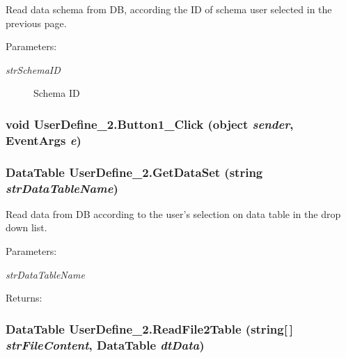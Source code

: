 Read data schema from DB, according the ID of schema user selected in the previous page. 

\begin{Desc}
\item[Parameters:]
\begin{description}
\item[{\em str\-Schema\-ID}]Schema ID\end{description}
\end{Desc}
\subsubsection{\setlength{\rightskip}{0pt plus 5cm}void User\-Define\_\-2.Button1\_\-Click (object {\em sender}, Event\-Args {\em e})\hspace{0.3cm}{\tt  [protected]}}\label{class_user_define__2_5b011d4483a8a941a435c3bbde949ae3}


\subsubsection{\setlength{\rightskip}{0pt plus 5cm}Data\-Table User\-Define\_\-2.Get\-Data\-Set (string {\em str\-Data\-Table\-Name})\hspace{0.3cm}{\tt  [private]}}\label{class_user_define__2_0c53ff63b611c1d629c20e8965177472}


Read data from DB according to the user's selection on data table in the drop down list. 

\begin{Desc}
\item[Parameters:]
\begin{description}
\item[{\em str\-Data\-Table\-Name}]\end{description}
\end{Desc}
\begin{Desc}
\item[Returns:]\end{Desc}
\subsubsection{\setlength{\rightskip}{0pt plus 5cm}Data\-Table User\-Define\_\-2.Read\-File2Table (string[$\,$] {\em str\-File\-Content}, Data\-Table {\em dt\-Data})\hspace{0.3cm}{\tt  [private]}}\label{class_user_define__2_a8496ae541638350fecaa15c962fa64c}



